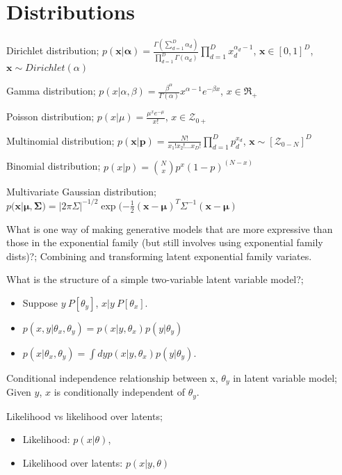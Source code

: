 \documentclass{article}
\begin{document}
	
\section{Distributions}


Dirichlet distribution; $p(\mathbf{x}|\mathbf{\alpha}) = \frac{\Gamma (\sum_{d=1}^{D}\alpha_d)}{\prod_{d=1}^{D}\Gamma(\alpha_d)}\prod_{d=1}^{D}x_d^{\alpha_{d}-1}$, $\mathbf{x}\in [0,1]^D$, $\mathbf{x}\sim Dirichlet(\alpha)$

Gamma distribution; $p(x|\alpha, \beta) = \frac{\beta^{\alpha}}{\Gamma(\alpha)}x^{\alpha-1}e^{-\beta x}$, $x\in \Re_+$

Poisson distribution; $p(x|\mu) = \frac{\mu^xe^{-\mu}}{x!}$, $x\in\mathcal{Z}_{0+}$

Multinomial distribution; $p(\mathbf{x|p})=\frac{N!}{x_1!x_2!...x_D!}\prod_{d=1}^{D}p_d^{x_d}$, $\mathbf{x}\sim [\mathcal{Z}_{0-N}]^D$

Binomial distribution; $p(x|p) = {N\choose x} p^x(1-p)^{(N-x)}$

Multivariate Gaussian distribution; $p(\mathbf{x}|\mathbf{\mu, \Sigma}) = |2\pi\Sigma|^{-1/2}\exp(-\frac{1}{2}(\mathbf{x-\mu})^T\Sigma^{-1}(\mathbf{x-\mu})$

What is one way of making generative models that are more expressive than those in the exponential family (but still involves using exponential family dists)?; Combining and transforming latent exponential family variates.

What is the structure of a simple two-variable latent variable model?; \begin{itemize} \item Suppose $y~P[\theta_y]$, $x|y~P[\theta_x]$.  \item $p(x,y|\theta_x, \theta_y) = p(x|y, \theta_x)p(y|\theta_y)$ \item $p(x|\theta_x, \theta_y) = \int dy p(x|y, \theta_x) p(y|\theta_y)$.  \end{itemize}

Conditional independence relationship between x, $\theta_y$ in latent variable model; Given $y$, $x$ is conditionally independent of $\theta_y$.

Likelihood vs likelihood over latents; \begin{itemize}	\item Likelihood: $p(x|\theta)$,	\item Likelihood over latents: $p(x|y, \theta)$ \end{itemize}
\end{document}
